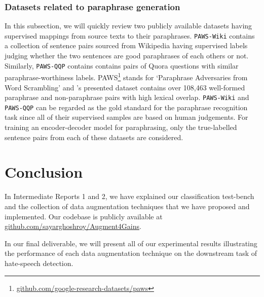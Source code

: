 \documentclass[11pt,a4paper]{article}
\begin{document}
\label{sec:Paraphrase_Data}
\subsubsection{Datasets related to paraphrase generation}
In this subsection, we will quickly review two publicly available datasets having supervised mappings from source texts to their paraphrases. \texttt{PAWS-Wiki} \cite{paws} contains a collection of sentence pairs sourced from Wikipedia having supervised labels judging whether the two sentences are good paraphrases of each others or not. Similarly, \texttt{PAWS-QQP} contains contains pairs of Quora questions with similar paraphrase-worthiness labels. PAWS\footnote{\url{github.com/google-research-datasets/paws}} stands for `Paraphrase Adversaries from Word Scrambling' and \citet{paws}'s presented dataset contains over 108,463 well-formed paraphrase and non-paraphrase pairs with high lexical overlap. \texttt{PAWS-Wiki} and \texttt{PAWS-QQP} can be regarded as the gold standard for the paraphrase recognition task since all of their supervised samples are based on human judgements. For training an encoder-decoder model for paraphrasing, only the true-labelled sentence pairs from each of these datasets are considered.

\section{Conclusion}
In Intermediate Reports 1 and 2, we have explained our classification test-bench and the collection of data augmentation techniques that we have proposed and implemented. Our codebase is publicly available at \url{github.com/sayarghoshroy/Augment4Gains}.

In our final deliverable, we will present all of our experimental results illustrating the performance of each data augmentation technique on the downstream task of hate-speech detection.



\end{document}
